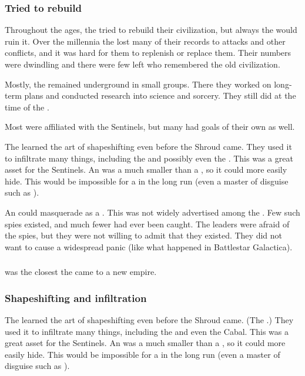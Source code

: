 \subsubsection{Tried to rebuild}
Throughout the ages, the \ophidians tried to rebuild their civilization, but always the  would ruin it.
Over the millennia the \ophidians lost many of their records to \noggyal attacks and other conflicts, and it was hard for them to replenish or replace them.
Their numbers were dwindling and there were few left who remembered the old \ophidian civilization. 

Mostly, the \ophidians remained underground in small groups.
There they worked on long-term plans and conducted research into science and sorcery. 
They still did at the time of the \thirdbanewar. 

Most \ophidians were affiliated with the Sentinels, but many had goals of their own as well.

The \ophidians learned the art of shapeshifting even before the Shroud came. 
They used it to infiltrate many things, including the \aryothim and possibly even the \resphain. 
This was a great asset for the Sentinels. 
An \ophidian was a much smaller \vertex than a \dragon, so it could more easily hide.
This would be impossible for a \dragon in the long run (even a master of disguise such as \Nzessuacrith). 

An \ophidian could masquerade as a \bezed. 
This was not widely advertised among the \resphain.
Few such spies existed, and much fewer had ever been caught. 
The \resphan leaders were afraid of the spies, but they were not willing to admit that they existed.
They did not want to cause a widespread panic (like what happened in Battlestar Galactica).





\subsubsection{\Saphyrae}
 was the closest the \ophidians came to a new empire. 





\subsubsection{Shapeshifting and infiltration}
The \ophidians learned the art of shapeshifting even before the Shroud came. 
(The \dragons {}.)
They used it to infiltrate many things, including the \aryothim and even the Cabal. 
This was a great asset for the Sentinels. 
An \ophidian was a much smaller \vertex than a \dragon, so it could more easily hide.
This would be impossible for a \dragon in the long run (even a master of disguise such as \Nzessuacrith). 

